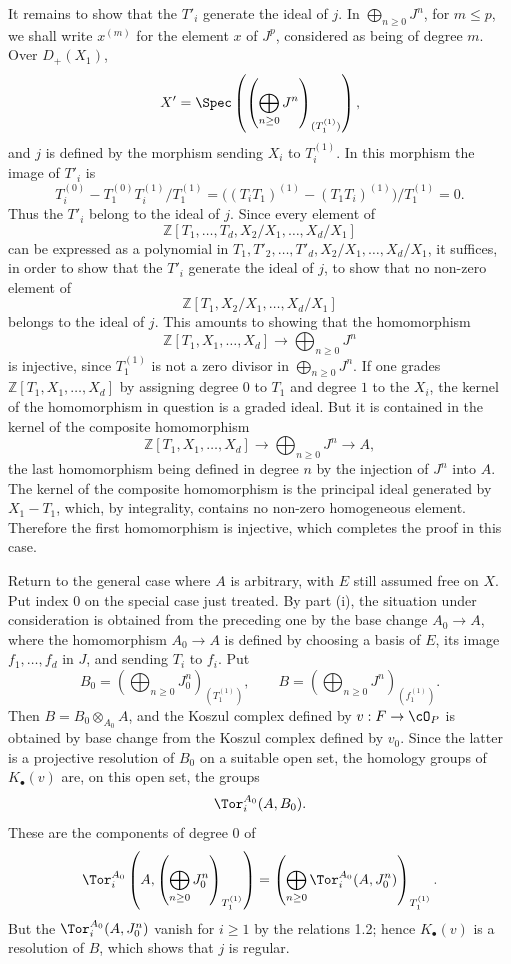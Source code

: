 It remains to show that the \(T'_i\) generate the ideal of \(j\). In \(\bigoplus_{n\ge0}J^n\), for \(m\le p\), we shall write \(x^{(m)}\) for the element \(x\) of \(J^p\), considered as being of degree \(m\). Over \(D_+(X_1)\),
\[
  X'=\Spec\left(\left(\bigoplus_{n\ge0}J^n\right)_{(T_1^{(1)})}\right),
\]
and \(j\) is defined by the morphism sending \(X_i\) to \(T_i^{(1)}\). In this morphism the image of \(T'_i\) is
\[
T_i^{(0)}-T_1^{(0)}T_i^{(1)}/T_1^{(1)}
=\bigl((T_iT_1)^{(1)}-(T_1T_i)^{(1)}\bigr)/T_1^{(1)}=0.
\]
Thus the \(T'_i\) belong to the ideal of \(j\). Since every element of
\[
\mathbb Z[T_1,\ldots,T_d,X_2/X_1,\ldots,X_d/X_1]
\]
can be expressed as a polynomial in \(T_1,T'_2,\ldots,T'_d,X_2/X_1,\ldots,X_d/X_1\), it suffices, in order to show that the \(T'_i\) generate the ideal of \(j\), to show that no non-zero element of
\[
\mathbb Z[T_1,X_2/X_1,\ldots,X_d/X_1]
\]
belongs to the ideal of \(j\). This amounts to showing that the homomorphism
\[
\mathbb Z[T_1,X_1,\ldots,X_d]\longrightarrow\bigoplus_{n\ge0}J^n
\]
is injective, since \(T_1^{(1)}\) is not a zero divisor in \(\bigoplus_{n\ge0}J^n\). If one grades \(\mathbb Z[T_1,X_1,\ldots,X_d]\) by assigning degree \(0\) to \(T_1\) and degree \(1\) to the \(X_i\), the kernel of the homomorphism in question is a graded ideal. But it is contained in the kernel of the composite homomorphism
\[
\mathbb Z[T_1,X_1,\ldots,X_d]\longrightarrow
\bigoplus_{n\ge0}J^n\longrightarrow A,
\]
the last homomorphism being defined in degree \(n\) by the injection of \(J^n\) into \(A\). The kernel of the composite homomorphism is the principal ideal generated by \(X_1-T_1\), which, by integrality, contains no non-zero homogeneous element. Therefore the first homomorphism is injective, which completes the proof in this case.

Return to the general case where \(A\) is arbitrary, with \(E\) still assumed free on \(X\). Put index \(0\) on the special case just treated. By part (i), the situation under consideration is obtained from the preceding one by the base change \(A_0\to A\), where the homomorphism \(A_0\to A\) is defined by choosing a basis of \(E\), its image \(f_1,\ldots,f_d\) in \(J\), and sending \(T_i\) to \(f_i\). Put
\[
  B_0=\left(\bigoplus_{n\ge0}J_0^n\right)_{(T_1^{(1)})},\qquad
  B=\left(\bigoplus_{n\ge0}J^n\right)_{(f_1^{(1)})}.
\]
Then \(B=B_0\otimes_{A_0}A\), and the Koszul complex defined by \(v:F\to\cO_P\) is obtained by base change from the Koszul complex defined by \(v_0\). Since the latter is a projective resolution of \(B_0\) on a suitable open set, the homology groups of \(K_\bullet(v)\) are, on this open set, the groups
\[
\Tor_i^{A_0}(A,B_0).
\]
These are the components of degree \(0\) of
\[
\Tor_i^{A_0}\left(A,\left(\bigoplus_{n\ge0}J_0^n\right)_{T_1^{(1)}}\right)
=\left(\bigoplus_{n\ge0}\Tor_i^{A_0}(A,J_0^n)\right)_{T_1^{(1)}}.
\]
But the \(\Tor_i^{A_0}(A,J_0^n)\) vanish for \(i\ge1\) by the relations 1.2; hence \(K_\bullet(v)\) is a resolution of \(B\), which shows that \(j\) is regular.

